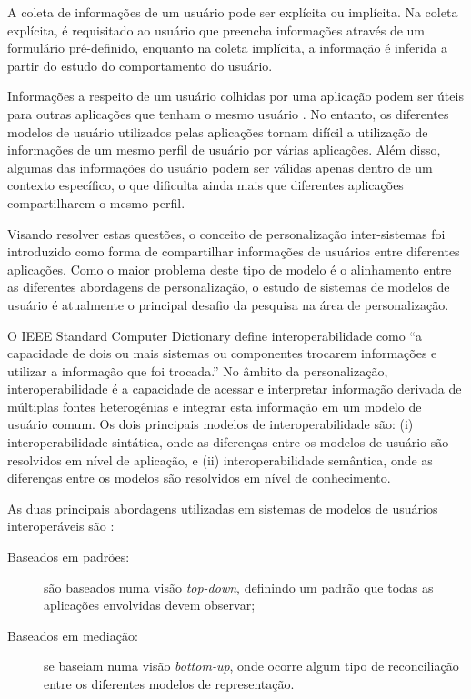 A coleta de informações de um usuário pode ser explícita ou implícita\cite{viviani10}. Na coleta explícita, é requisitado ao usuário que preencha informações através de um formulário pré-definido, enquanto na coleta implícita, a informação é inferida a partir do estudo do comportamento do usuário.

Informações a respeito de um usuário colhidas por uma aplicação podem ser úteis para outras aplicações que tenham o mesmo usuário \cite{viviani10}. No entanto, os diferentes modelos de usuário utilizados pelas aplicações tornam difícil a utilização de informações de um mesmo perfil de usuário por várias aplicações. Além disso, algumas das informações do usuário podem ser válidas apenas dentro de um contexto específico, o que dificulta ainda mais que diferentes aplicações compartilharem o mesmo perfil.

Visando resolver estas questões, o conceito de personalização inter-sistemas foi introduzido \cite{niederee04} como forma de compartilhar informações de usuários entre diferentes aplicações. Como o maior problema deste tipo de modelo é o alinhamento entre as diferentes abordagens de personalização, o estudo de sistemas de modelos de usuário é atualmente o principal desafio da pesquisa na área de personalização.\cite{viviani10}

O IEEE Standard Computer Dictionary \cite{ieeedict} define interoperabilidade como ``a capacidade de dois ou mais sistemas ou componentes trocarem informações e utilizar a informação que foi trocada.'' No âmbito da personalização, interoperabilidade é a capacidade de acessar e interpretar informação derivada de múltiplas fontes heterogênias e integrar esta informação em um modelo de usuário comum\cite{carmagnola09}. Os dois principais modelos de interoperabilidade são: (i) interoperabilidade sintática, onde as diferenças entre os modelos de usuário são resolvidos em nível de aplicação, e (ii) interoperabilidade semântica, onde as diferenças entre os modelos são resolvidos em nível de conhecimento.

As duas principais abordagens utilizadas em sistemas de modelos de usuários interoperáveis são \cite{viviani10}:

\begin{description}

  \item[Baseados em padrões:] são baseados numa visão \emph{top-down}, definindo um padrão que todas as aplicações envolvidas devem observar;
  \item[Baseados em mediação:] se baseiam numa visão \emph{bottom-up}, onde ocorre algum tipo de reconciliação entre os diferentes modelos de representação.

\end{description}


%


